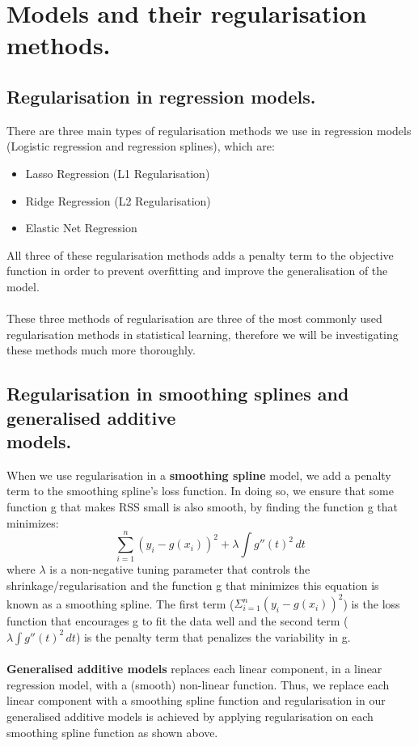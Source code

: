 \documentclass[12pt]{article}
\begin{document}
\section*{Models and their regularisation methods.}

\subsection*{Regularisation in regression models.}
There are three main types of regularisation methods we use in regression models (Logistic regression and regression splines), which are:
\begin{itemize}
    \item Lasso Regression (L1 Regularisation)
    \item Ridge Regression (L2 Regularisation)
    \item Elastic Net Regression
\end{itemize}
All three of these regularisation methods adds a penalty term to the objective function
in order to prevent overfitting and improve the generalisation of the model. \\ \\
These three methods of regularisation are three of the most commonly used regularisation methods
in statistical learning, therefore we will be investigating these methods much more thoroughly.

\subsection*{Regularisation in smoothing splines and generalised additive \\ models.}
When we use regularisation in a \textbf{smoothing spline} model, we add a penalty term to the smoothing spline's
loss function. In doing so, we ensure that some function g that makes RSS small is also smooth, by finding the function
g that minimizes: $$ \sum_{i=1}^{n}(y_i-g(x_i))^2 + \lambda \int g''(t)^2 \,dt  $$ where $\lambda$ is a non-negative tuning parameter
that controls the shrinkage/regularisation and the function g that minimizes this equation is known as a smoothing spline.
The first term ($\Sigma_{i=1}^{n}(y_i-g(x_i))^2$) is the loss function that encourages g to fit the data well
and the second term ($\lambda \int g''(t)^2 \,dt$) is the penalty term that penalizes the variability in g.
\\ \\
\textbf{Generalised additive models} replaces each linear component, in a linear regression model, with a (smooth) non-linear function.
Thus, we replace each linear component with a smoothing spline function and regularisation in our generalised additive models is
achieved by applying regularisation on each smoothing spline function as shown above.
\end{document}
